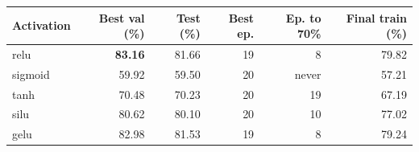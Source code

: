 \begin{tabular}{lrrrrr}
\toprule
Activation & Best val (\%) & Test (\%) & Best ep. & Ep. to 70\% & Final train (\%) \\
\midrule
relu & \textbf{83.16} & 81.66 & 19 & 8 & 79.82 \\
sigmoid & 59.92 & 59.50 & 20 & never & 57.21 \\
tanh & 70.48 & 70.23 & 20 & 19 & 67.19 \\
silu & 80.62 & 80.10 & 20 & 10 & 77.02 \\
gelu & 82.98 & 81.53 & 19 & 8 & 79.24 \\
\bottomrule
\end{tabular}
